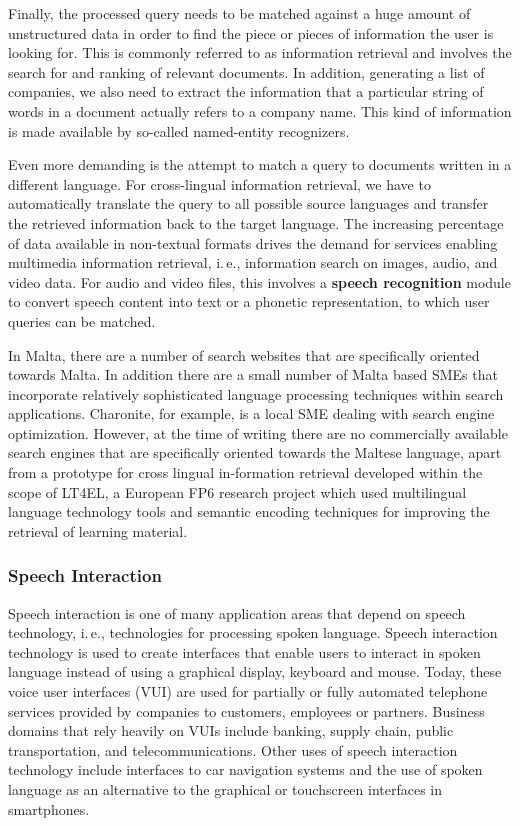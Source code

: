 \documentclass[]{../../metanetpaper}
\begin{document}
\begin{multicols}{2}
Finally, the processed query needs to be matched against a huge amount of unstructured data in order to find the piece or pieces of information the user is looking for. This is commonly referred to as information retrieval and involves the search for and ranking of relevant documents. In addition, generating a list of companies, we also need to extract the information that a particular string of words in a document actually refers to a company name. This kind of information is made available by so-called named-entity recognizers. 

Even more demanding is the attempt to match a query to documents written in a different language. For cross-lingual information retrieval, we have to automatically translate the query to all possible source languages and transfer the retrieved information back to the target language. The increasing percentage of data available in non-textual formats drives the demand for services enabling multimedia information retrieval, i.\,e., information search on images, audio, and video data. For audio and video files, this involves a \textbf{speech recognition} module to convert speech content into text or a phonetic representation, to which user queries can be matched.

In Malta, there are a number of search websites that are specifically oriented towards Malta\cite{philb1}. In addition there are a small number of Malta based SMEs that incorporate relatively sophisticated language processing techniques within search applications. Charonite\cite{charonite1}, for example, is a local SME dealing with search engine optimization. However, at the time of writing there are no commercially available search engines that are specifically oriented towards the Maltese language, apart from a prototype for cross lingual in-formation retrieval developed within the scope of LT4EL\cite{let1}, a European FP6 research project which used multilingual language technology tools and semantic encoding techniques for improving the retrieval of learning material. 

\subsubsection{Speech Interaction}

Speech interaction is one of many application areas that depend on speech technology, i.\,e., technologies for processing spoken language. Speech interaction technology is used to create interfaces that enable users to interact in spoken language instead of using a graphical display, keyboard and mouse.  Today, these voice user interfaces (VUI) are used for partially or fully automated telephone services provided by companies to customers, employees or partners. Business domains that rely heavily on VUIs include banking, supply chain, public transportation, and telecommunications. Other uses of speech interaction technology include interfaces to car navigation systems and the use of spoken language as an alternative to the graphical or touchscreen interfaces in smartphones.


\end{multicols}
\end{document}
